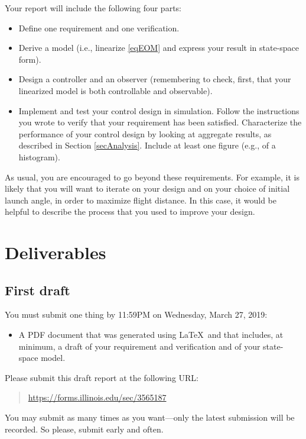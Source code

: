 \documentclass[12pt]{article}
\begin{document}
Your report will include the following four parts:
\begin{itemize}

\item Define one requirement and one verification.

\item Derive a model (i.e., linearize \eqref{eqEOM} and express your result in state-space form).

\item Design a controller and an observer (remembering to check, first, that your linearized model is both controllable and observable).

\item Implement and test your control design in simulation. Follow the instructions you wrote to verify that your requirement has been satisfied. Characterize the performance of your control design by looking at aggregate results, as described in Section \ref{secAnalysis}. Include at least one figure (e.g., of a histogram).

\end{itemize}
As usual, you are encouraged to go beyond these requirements. For example, it is likely that you will want to iterate on your design and on your choice of initial launch angle, in order to maximize flight distance. In this case, it would be helpful to describe the process that you used to improve your design.


\section{Deliverables}


\subsection{First draft}

You must submit one thing by 11:59PM on Wednesday, March 27, 2019:
\begin{itemize}
\item A PDF document that was generated using \LaTeX\ and that includes, at minimum, a draft of your requirement and verification and of your state-space model.
\end{itemize}
Please submit this draft report at the following URL:
\begin{quote}
\url{https://forms.illinois.edu/sec/3565187}
\end{quote}
You may submit as many times as you want---only the latest submission will be recorded. So please, submit early and often.
\end{document}
